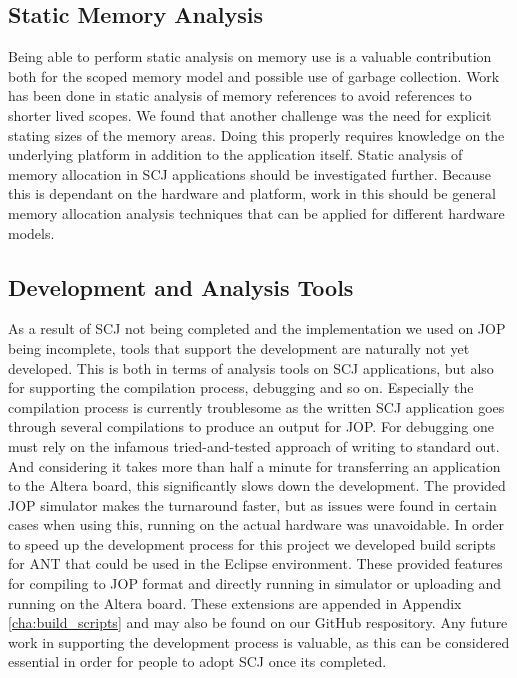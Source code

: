 \subsection{Static Memory Analysis} %
\label{sub:memoryanalysis}
Being able to perform static analysis on memory use is a valuable contribution both for the scoped memory model and possible use of garbage collection. Work has been done in static analysis of memory references to avoid references to shorter lived scopes\cite{Dalsgaard:2012:PMA:2388936.2388939}. We found that another challenge was the need for explicit stating sizes of the memory areas. Doing this properly requires knowledge on the underlying platform in addition to the application itself. Static analysis of memory allocation in SCJ applications should be investigated further. Because this is dependant on the hardware and platform, work in this should be general memory allocation analysis techniques that can be applied for different hardware models.


\subsection{Development and Analysis Tools} %
\label{sub:development_and_analysis_tools}
As a result of SCJ not being completed and the implementation we used on JOP being incomplete, tools that support the development are naturally not yet developed. This is both in terms of analysis tools on SCJ applications, but also for supporting the compilation process, debugging and so on. Especially the compilation process is currently troublesome as the written SCJ application goes through several compilations to produce an output for JOP. For debugging one must rely on the infamous tried-and-tested approach of writing to standard out. And considering it takes more than half a minute for transferring an application to the Altera board, this significantly slows down the development. The provided JOP simulator makes the turnaround faster, but as issues were found in certain cases when using this, running on the actual hardware was unavoidable. In order to speed up the development process for this project we developed build scripts for ANT that could be used in the Eclipse environment. These provided features for compiling to JOP format and directly running in simulator or uploading and running on the Altera board. These extensions are appended in Appendix \ref{cha:build_scripts} and may also be found on our GitHub respository\cite{SW902e12:CSPinSCJ}. Any future work in supporting the development process is valuable, as this can be considered essential in order for people to adopt SCJ once its completed.


